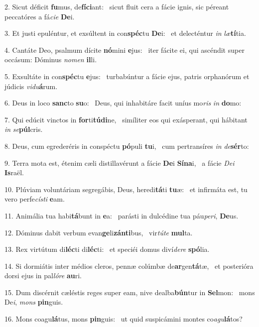 2. Sicut déficit \textbf{fu}mus, de\textbf{fí}\textbf{ci}ant: \ast\  sicut fluit cera a fácie ignis, sic péreant peccatóres a fá\textit{ci}\textit{e} \textbf{De}i.\

3. Et justi epuléntur, et exsúltent in con\textbf{spéc}tu \textbf{De}i: \ast\  et delecténtur \textit{in} \textit{læ}\textbf{tí}tia.\

4. Cantáte Deo, psalmum dícite \textbf{nó}mini \textbf{e}jus: \ast\  iter fácite ei, qui ascéndit super occásum: Dóminus \textit{no}\textit{men} \textbf{il}li.\

5. Exsultáte in con\textbf{spéc}tu \textbf{e}jus: \ast\  turbabúntur a fácie ejus, patris orphanórum et júdicis \textit{vi}\textit{du}\textbf{á}rum.\

6. Deus in loco \textbf{sanc}to \textbf{su}o: \ast\  Deus, qui inhabitáre facit uníus mo\textit{ris} \textit{in} \textbf{do}mo:\

7. Qui edúcit vinctos in \textbf{for}ti\textbf{tú}\textbf{di}ne, \ast\  simíliter eos qui exásperant, qui hábitant \textit{in} \textit{se}\textbf{púl}cris.\

8. Deus, cum egrederéris in conspéctu \textbf{pó}puli \textbf{tu}i, \ast\  cum pertransíres \textit{in} \textit{de}\textbf{sér}to:\

9. Terra mota est, étenim cæli distillavérunt a fácie \textbf{De}i \textbf{Sí}\textbf{na}i, \ast\  a fácie \textit{De}\textit{i} \textbf{Is}raël.\

10. Plúviam voluntáriam segregábis, Deus, heredi\textbf{tá}ti \textbf{tu}æ: \ast\  et infirmáta est, tu vero perfe\textit{cís}\textit{ti} \textbf{e}am.\

11. Animália tua habi\textbf{tá}bunt in \textbf{e}a: \ast\  parásti in dulcédine tua páu\textit{pe}\textit{ri}, \textbf{De}us.\

12. Dóminus dabit verbum evan\textbf{ge}li\textbf{zán}\textbf{ti}bus, \ast\  vir\textit{tú}\textit{te} \textbf{mul}ta.\

13. Rex virtútum di\textbf{léc}ti di\textbf{léc}ti: \ast\  et speciéi domus diví\textit{de}\textit{re} \textbf{spó}lia.\

14. Si dormiátis inter médios cleros, pennæ colúmbæ de\textbf{ar}gen\textbf{tá}tæ, \ast\  et posterióra dorsi ejus in pal\textit{ló}\textit{re} \textbf{au}ri.\

15. Dum discérnit cæléstis reges super eam, nive dealba\textbf{bún}tur in \textbf{Sel}mon: \ast\  mons De\textit{i}, \textit{mons} \textbf{pin}guis.\

16. Mons coagu\textbf{lá}tus, mons \textbf{pin}guis: \ast\  ut quid suspicámini montes co\textit{a}\textit{gu}\textbf{lá}tos?\


